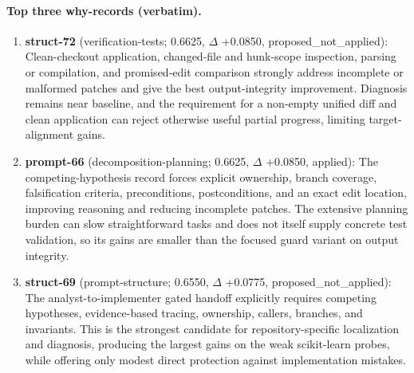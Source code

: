 \paragraph{Top three why-records (verbatim).}\begin{enumerate}\itemsep1pt
\item \textbf{struct-72} (verification-tests; 0.6625, $\Delta$ +0.0850, proposed\_not\_applied): Clean-checkout application, changed-file and hunk-scope inspection, parsing or compilation, and promised-edit comparison strongly address incomplete or malformed patches and give the best output-integrity improvement. Diagnosis remains near baseline, and the requirement for a non-empty unified diff and clean application can reject otherwise useful partial progress, limiting target-alignment gains.
\item \textbf{prompt-66} (decomposition-planning; 0.6625, $\Delta$ +0.0850, applied): The competing-hypothesis record forces explicit ownership, branch coverage, falsification criteria, preconditions, postconditions, and an exact edit location, improving reasoning and reducing incomplete patches. The extensive planning burden can slow straightforward tasks and does not itself supply concrete test validation, so its gains are smaller than the focused guard variant on output integrity.
\item \textbf{struct-69} (prompt-structure; 0.6550, $\Delta$ +0.0775, proposed\_not\_applied): The analyst-to-implementer gated handoff explicitly requires competing hypotheses, evidence-based tracing, ownership, callers, branches, and invariants. This is the strongest candidate for repository-specific localization and diagnosis, producing the largest gains on the weak scikit-learn probes, while offering only modest direct protection against implementation mistakes.
\end{enumerate}
